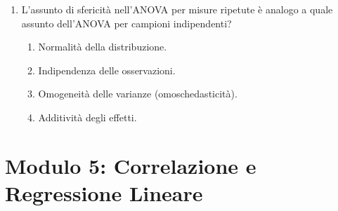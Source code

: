 \documentclass[12pt, a4paper]{article}
\begin{document}
\begin{enumerate}[resume]
    \item L'assunto di sfericità nell'ANOVA per misure ripetute è analogo a quale assunto dell'ANOVA per campioni indipendenti?
    \begin{enumerate}
        \item Normalità della distribuzione.
        \item Indipendenza delle osservazioni.
        \item Omogeneità delle varianze (omoschedasticità).
        \item Additività degli effetti.
    \end{enumerate}
    \vspace{0.3cm}
\end{enumerate}

\section*{Modulo 5: Correlazione e Regressione Lineare}
\end{document}
